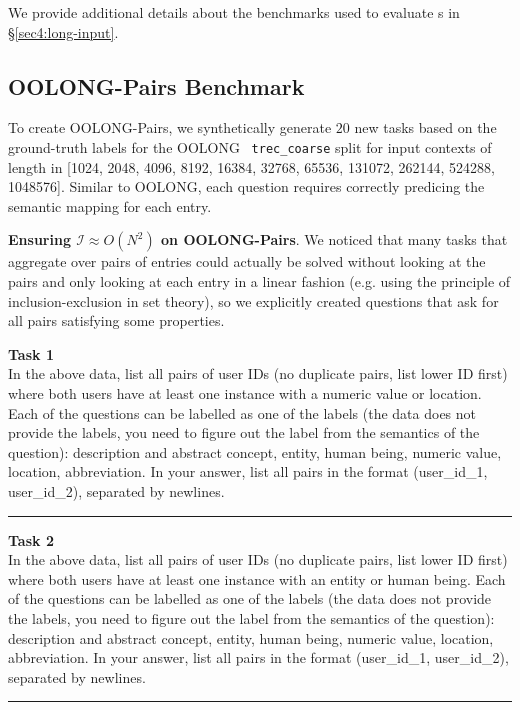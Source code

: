 We provide additional details about the benchmarks used to evaluate \RLM{}s in \S\ref{sec4:long-input}.

\subsection{OOLONG-Pairs Benchmark} \label{appx:oolong-pairs}
To create OOLONG-Pairs, we synthetically generate $20$ new tasks based on the ground-truth labels for the OOLONG~\cite{bertsch2025oolongevaluatinglongcontext} \texttt{trec\_coarse} split for input contexts of length in [1024, 2048, 4096, 8192, 16384, 32768, 65536, 131072, 262144, 524288, 1048576]. Similar to OOLONG, each question requires correctly predicing the semantic mapping for each entry.

\textbf{Ensuring $\mathcal{I} \approx O(N^2)$ on OOLONG-Pairs}. We noticed that many tasks that aggregate over pairs of entries could actually be solved without looking at the pairs and only looking at each entry in a linear fashion (e.g. using the principle of inclusion-exclusion in set theory), so we explicitly created questions that ask for all pairs satisfying some properties.

\newcommand{\questionblock}[2]{
\vspace{1.25em}
\noindent\textbf{Task #1}\\[0.25em]
#2
\vspace{0.5em}
\hrule
}

\questionblock{1}{In the above data, list all pairs of user IDs (no duplicate pairs, list lower ID first) where both users have at least one instance with a numeric value or location. Each of the questions can be labelled as one of the labels (the data does not provide the labels, you need to figure out the label from the semantics of the question): description and abstract concept, entity, human being, numeric value, location, abbreviation. In your answer, list all pairs in the format (user\_id\_1, user\_id\_2), separated by newlines.}

\questionblock{2}{In the above data, list all pairs of user IDs (no duplicate pairs, list lower ID first) where both users have at least one instance with an entity or human being. Each of the questions can be labelled as one of the labels (the data does not provide the labels, you need to figure out the label from the semantics of the question): description and abstract concept, entity, human being, numeric value, location, abbreviation. In your answer, list all pairs in the format (user\_id\_1, user\_id\_2), separated by newlines.}

